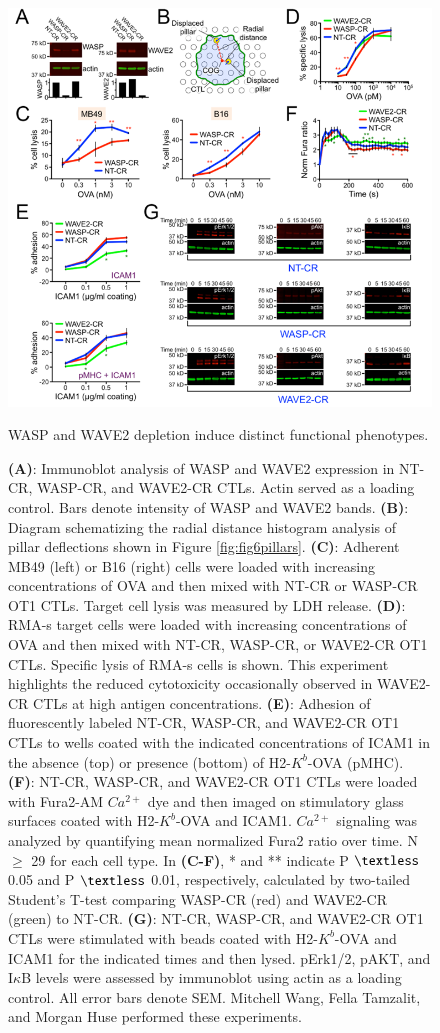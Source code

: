 \begin{figure}[htbp]
	\centering
	\includegraphics[width=\textwidth]{../figures/chapter2/fig6supp.png}
	\caption{WASP and WAVE2 depletion induce distinct functional phenotypes.}
	\caption*{\textbf{(A)}: Immunoblot analysis of WASP and WAVE2 expression in NT-CR, WASP-CR, and WAVE2-CR CTLs. Actin served as a loading control. Bars denote intensity of WASP and WAVE2 bands. \textbf{(B)}: Diagram schematizing the radial distance histogram analysis of pillar deflections shown in Figure \ref{fig:fig6pillars}. \textbf{(C)}: Adherent MB49 (left) or B16 (right) cells were loaded with increasing concentrations of OVA and then mixed with NT-CR or WASP-CR OT1 CTLs. Target cell lysis was measured by LDH release. \textbf{(D)}: RMA-s target cells were loaded with increasing concentrations of OVA and then mixed with NT-CR, WASP-CR, or WAVE2-CR OT1 CTLs. Specific lysis of RMA-s cells is shown. This experiment highlights the reduced cytotoxicity occasionally observed in WAVE2-CR CTLs at high antigen concentrations. \textbf{(E)}: Adhesion of fluorescently labeled NT-CR, WASP-CR, and WAVE2-CR OT1 CTLs to wells coated with the indicated concentrations of ICAM1 in the absence (top) or presence (bottom) of H2-$K^{b}$-OVA (pMHC). \textbf{(F)}: NT-CR, WASP-CR, and WAVE2-CR OT1 CTLs were loaded with Fura2-AM $Ca^{2+}$ dye and then imaged on stimulatory glass surfaces coated with H2-$K^{b}$-OVA and ICAM1. $Ca^{2+}$ signaling was analyzed by quantifying mean normalized Fura2 ratio over time. N $\geq$ 29 for each cell type. In \textbf{(C-F)}, * and ** indicate P $\textless$ 0.05 and P $\textless$ 0.01, respectively, calculated by two-tailed Student’s T-test comparing WASP-CR (red) and WAVE2-CR (green) to NT-CR. \textbf{(G)}: NT-CR, WASP-CR, and WAVE2-CR OT1 CTLs were stimulated with beads coated with H2-$K^{b}$-OVA and ICAM1 for the indicated times and then lysed. pErk1/2, pAKT, and I$\kappa$B levels were assessed by immunoblot using actin as a loading control. All error bars denote SEM. Mitchell Wang, Fella Tamzalit, and Morgan Huse performed these experiments.}
	\label{fig:fig6supp}
\end{figure}

